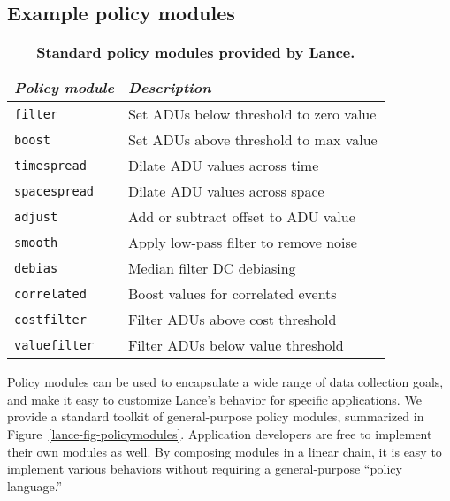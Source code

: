 \subsection{Example policy modules}

\begin{table}[t]
\label{lance-fig-policymodules}
\begin{center}
\begin{tabular}{|l|l|} \hline
\textit{Policy module} & \textit{Description} \\ \hline
\texttt{filter} & Set ADUs below threshold to zero value \\
\texttt{boost} & Set ADUs above threshold to max value \\
\texttt{timespread} & Dilate ADU values across time \\
\texttt{spacespread} & Dilate ADU values across space \\
\texttt{adjust} & Add or subtract offset to ADU value \\
\texttt{smooth} & Apply low-pass filter to remove noise \\
\texttt{debias} & Median filter DC debiasing \\
\texttt{correlated} & Boost values for correlated events \\
\texttt{costfilter} & Filter ADUs above cost threshold \\
\texttt{valuefilter} & Filter ADUs below value threshold \\ \hline
\end{tabular}
\end{center}

\caption{\textbf{Standard policy modules provided by Lance.}}

\label{lance-sec-example-policies}
\end{table}

Policy modules can be used to encapsulate a wide range of data collection
goals, and make it easy to customize Lance's behavior for specific
applications. We provide a standard toolkit of general-purpose policy
modules, summarized in Figure~\ref{lance-fig-policymodules}. Application
developers are free to implement their own modules as well. By composing
modules in a linear chain, it is easy to implement various behaviors without
requiring a general-purpose ``policy language.''

